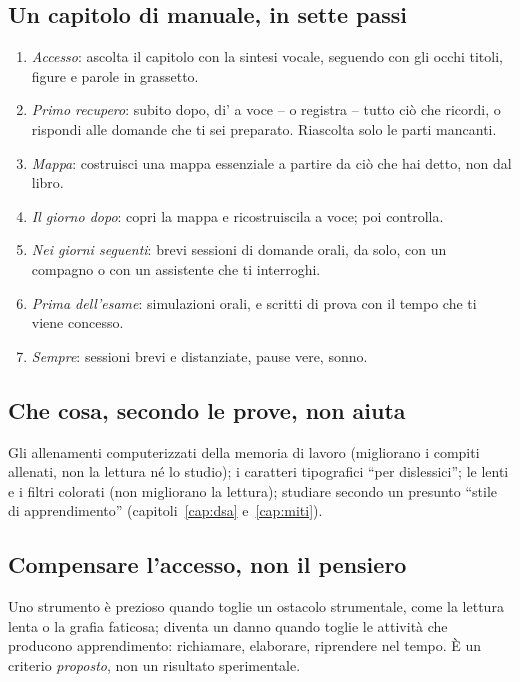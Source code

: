 \subsection*{Un capitolo di manuale, in sette passi}

\begin{enumerate}[leftmargin=1.4em, itemsep=0pt, topsep=0.2\baselineskip]
  \item \emph{Accesso}: ascolta il capitolo con la sintesi vocale,
        seguendo con gli occhi titoli, figure e parole in grassetto.
  \item \emph{Primo recupero}: subito dopo, di' a voce -- o registra -- tutto ciò che ricordi, o rispondi alle domande che ti sei preparato. Riascolta solo le parti mancanti.
  \item \emph{Mappa}: costruisci una mappa essenziale a partire da ciò
        che hai detto, non dal libro.
  \item \emph{Il giorno dopo}: copri la mappa e ricostruiscila a voce;
        poi controlla.
  \item \emph{Nei giorni seguenti}: brevi sessioni di domande orali,
        da solo, con un compagno o con un assistente che ti interroghi.
  \item \emph{Prima dell'esame}: simulazioni orali, e scritti di prova
        con il tempo che ti viene concesso.
  \item \emph{Sempre}: sessioni brevi e distanziate, pause vere,
        sonno.
\end{enumerate}

\subsection*{Che cosa, secondo le prove, non aiuta}

Gli allenamenti computerizzati della memoria di lavoro (migliorano i
compiti allenati, non la lettura né lo studio); i caratteri tipografici
\enquote{per dislessici}; le lenti e i filtri colorati (non migliorano la lettura); studiare secondo
un presunto \enquote{stile di apprendimento} (capitoli~\ref{cap:dsa}
e~\ref{cap:miti}).

\subsection*{Compensare l'accesso, non il pensiero}

Uno strumento è prezioso quando toglie un ostacolo strumentale, come la
lettura lenta o la grafia faticosa; diventa un danno quando toglie le
attività che producono apprendimento: richiamare, elaborare,
riprendere nel tempo. È un criterio \emph{proposto}, non un risultato
sperimentale.

